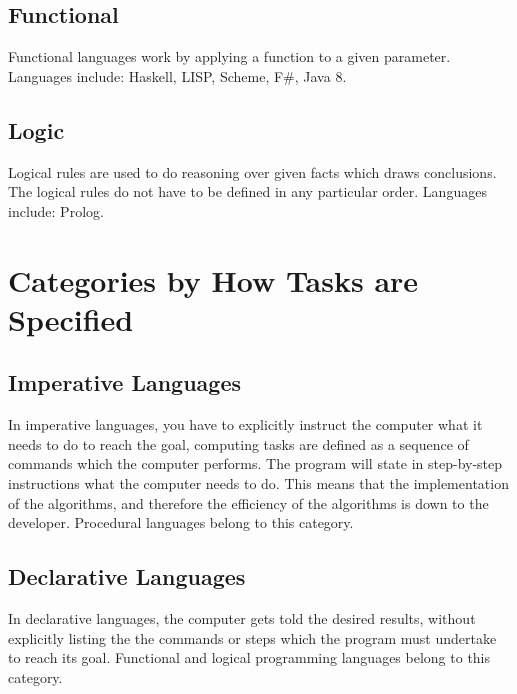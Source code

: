 \subsection{Functional}
Functional languages work by applying a function to a given parameter. Languages include: Haskell, LISP, Scheme, F\#, Java 8. 
\subsection{Logic}
Logical rules are used to do reasoning over given facts which draws conclusions. The logical rules do not have to be defined in any particular order. Languages include: Prolog.

\section{Categories by How Tasks are Specified}
\subsection{Imperative Languages}
In imperative languages, you have to explicitly instruct the computer what it needs to do to reach the goal, computing tasks are defined as a sequence of commands which the computer performs. The program will state in step-by-step instructions what the computer needs to do. This means that the implementation of the algorithms, and therefore the efficiency of the algorithms is down to the developer. Procedural languages belong to this category. 
\subsection{Declarative Languages}
In declarative languages, the computer gets told the desired results, without explicitly listing the the commands or steps which the program must undertake to reach its goal. Functional and logical programming languages belong to this category.